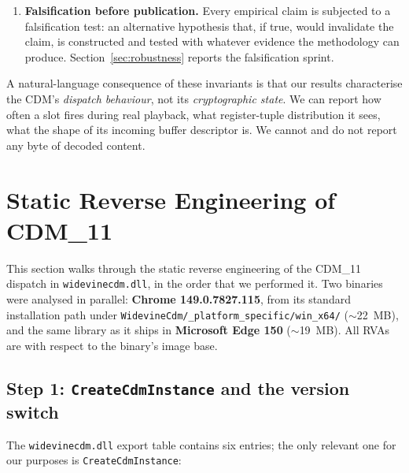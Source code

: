 \documentclass[11pt,letterpaper]{article}
\let\oldsection\section
\renewcommand{\section}{\clearpage\oldsection}
\begin{document}
\begin{enumerate}[itemsep=2pt,topsep=2pt]
        operator's own browser session to a commercial streaming
        service to confirm what the CDM does during steady state,
        but we never instrument the decoder, the kernel-side PMP
        component (\texttt{peauth.sys}), the protected surface, or
        any other component positioned to materialise a decrypted
        frame. The shape-only shim is the deepest hook in the
        stack we install.
  \item \textbf{Falsification before publication.} Every empirical
        claim is subjected to a falsification test: an alternative
        hypothesis that, if true, would invalidate the claim, is
        constructed and tested with whatever evidence the methodology
        can produce. Section~\ref{sec:robustness} reports the
        falsification sprint.
\end{enumerate}

A natural-language consequence of these invariants is that our
results characterise the CDM's \emph{dispatch behaviour}, not its
\emph{cryptographic state}. We can report how often a slot fires
during real playback, what register-tuple distribution it sees,
what the shape of its incoming buffer descriptor is. We cannot
and do not report any byte of decoded content.

\section{Static Reverse Engineering of CDM\_11}
\label{sec:static}

This section walks through the static reverse engineering of the
CDM\_11 dispatch in \texttt{widevinecdm.dll}, in the order that we
performed it. Two binaries were analysed in parallel: \textbf{Chrome
149.0.7827.115}, from its standard installation path
under \texttt{WidevineCdm/\_platform\_specific/win\_x64/}
($\sim$22~MB), and the same library as it ships in \textbf{Microsoft
Edge 150} ($\sim$19~MB). All RVAs are with respect to the binary's
image base.

\subsection{Step 1: \texttt{CreateCdmInstance} and the version
            switch}
\label{sec:static-export}

The \texttt{widevinecdm.dll} export table contains six entries; the
only relevant one for our purposes is \texttt{CreateCdmInstance}:
\end{document}
